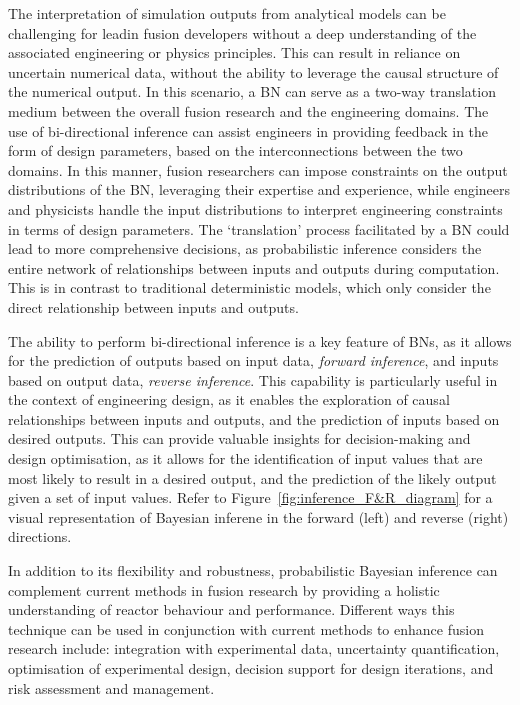 \documentclass[journal]{IEEEtran}
\begin{document}
The interpretation of simulation outputs from analytical models can be challenging for leadin fusion developers without a deep understanding of the associated engineering or physics principles. This can result in reliance on uncertain numerical data, without the ability to leverage the causal structure of the numerical output. In this scenario, a BN can serve as a two-way translation medium between the overall fusion research and the engineering domains. The use of bi-directional inference can assist engineers in providing feedback in the form of design parameters, based on the interconnections between the two domains. In this manner, fusion researchers can impose constraints on the output distributions of the BN, leveraging their expertise and experience, while engineers and physicists handle the input distributions to interpret engineering constraints in terms of design parameters. The `translation' process facilitated by a BN could lead to more comprehensive decisions, as probabilistic inference considers the entire network of relationships between inputs and outputs during computation. This is in contrast to traditional deterministic models, which only consider the direct relationship between inputs and outputs. 

The ability to perform bi-directional inference is a key feature of BNs, as it allows for the prediction of outputs based on input data, \textit{forward inference}, and inputs based on output data, \textit{reverse inference}. This capability is particularly useful in the context of engineering design, as it enables the exploration of causal relationships between inputs and outputs, and the prediction of inputs based on desired outputs. This can provide valuable insights for decision-making and design optimisation, as it allows for the identification of input values that are most likely to result in a desired output, and the prediction of the likely output given a set of input values. Refer to Figure~\ref{fig:inference_F&R_diagram} for a visual representation of Bayesian inferene in the forward (left) and reverse (right) directions. 

In addition to its flexibility and robustness, probabilistic Bayesian inference can complement current methods in fusion research by providing a holistic understanding of reactor behaviour and performance. Different ways this technique can be used in conjunction with current methods to enhance fusion research include: integration with experimental data, uncertainty quantification, optimisation of experimental design, decision support for design iterations, and risk assessment and management.
    
\end{document}
